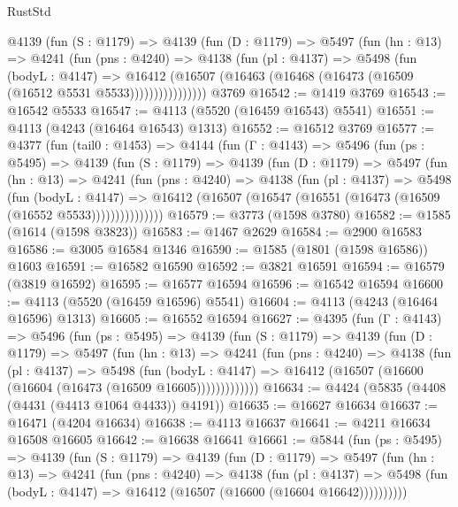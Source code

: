 \begin{lexlean}{RustStd}
\begin{coremodule}
          @4139
            (fun (S : @1179) =>
            @4139
              (fun (D : @1179) =>
              @5497
                (fun (hn : @13) =>
                @4241
                  (fun (pns : @4240) =>
                  @4138
                    (fun (pl : @4137) =>
                    @5498
                      (fun (bodyL : @4147) =>
                      @16412
                        (@16507 (@16463 (@16468 (@16473 (@16509 (@16512 @5531 @5533))))))))))))))))
    @3769
@16542 := @1419 @3769
@16543 := @16542 @5533
@16547 := @4113 (@5520 (@16459 @16543) @5541)
@16551 := @4113 (@4243 (@16464 @16543) @1313)
@16552 := @16512 @3769
@16577 := @4377
    (fun (tail0 : @1453) =>
    @4144
      (fun (Γ : @4143) =>
      @5496
        (fun (ps : @5495) =>
        @4139
          (fun (S : @1179) =>
          @4139
            (fun (D : @1179) =>
            @5497
              (fun (hn : @13) =>
              @4241
                (fun (pns : @4240) =>
                @4138
                  (fun (pl : @4137) =>
                  @5498
                    (fun (bodyL : @4147) =>
                    @16412 (@16507 (@16547 (@16551 (@16473 (@16509 (@16552 @5533)))))))))))))))
@16579 := @3773 (@1598 @3780)
@16582 := @1585 (@1614 (@1598 @3823))
@16583 := @1467 @2629
@16584 := @2900 @16583
@16586 := @3005 @16584 @1346
@16590 := @1585 (@1801 (@1598 @16586)) @1603
@16591 := @16582 @16590
@16592 := @3821 @16591
@16594 := @16579 (@3819 @16592)
@16595 := @16577 @16594
@16596 := @16542 @16594
@16600 := @4113 (@5520 (@16459 @16596) @5541)
@16604 := @4113 (@4243 (@16464 @16596) @1313)
@16605 := @16552 @16594
@16627 := @4395
    (fun (Γ : @4143) =>
    @5496
      (fun (ps : @5495) =>
      @4139
        (fun (S : @1179) =>
        @4139
          (fun (D : @1179) =>
          @5497
            (fun (hn : @13) =>
            @4241
              (fun (pns : @4240) =>
              @4138
                (fun (pl : @4137) =>
                @5498
                  (fun (bodyL : @4147) =>
                  @16412 (@16507 (@16600 (@16604 (@16473 (@16509 @16605)))))))))))))
@16634 := @4424 (@5835 (@4408 (@4431 (@4413 @1064 @4433)) @4191))
@16635 := @16627 @16634
@16637 := @16471 (@4204 @16634)
@16638 := @4113 @16637
@16641 := @4211 @16634 @16508 @16605
@16642 := @16638 @16641
@16661 := @5844
    (fun (ps : @5495) =>
    @4139
      (fun (S : @1179) =>
      @4139
        (fun (D : @1179) =>
        @5497
          (fun (hn : @13) =>
          @4241
            (fun (pns : @4240) =>
            @4138
              (fun (pl : @4137) =>
              @5498 (fun (bodyL : @4147) => @16412 (@16507 (@16600 (@16604 @16642))))))))))

\end{coremodule}
\end{lexlean}
